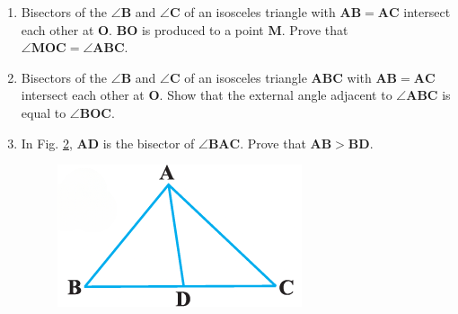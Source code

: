 \documentclass{article}
\let\vec\mathbf
\begin{document}
\begin{enumerate}[label=\thesection.\arabic*,ref=\thesection.\theenumi]
\begin{figure}[h]
	\caption{}
	\label{fig:exemplar/9.7.37.3.8}
\end{figure}
\item Bisectors of the $\angle \vec{B}$ and $\angle \vec{C}$ of an isosceles triangle with $\vec{AB=AC}$ intersect each other at $\vec{O}$. $\vec{BO}$ is produced to a point $\vec{M}$. Prove that $\angle \vec{MOC}= \angle \vec{ABC}$.
\item Bisectors of the $\angle \vec{B}$ and $\angle \vec{C}$ of an isosceles triangle $\vec{ABC}$ with $\vec{AB=AC}$ intersect each other at $\vec{O}$. Show that the external angle adjacent to $\angle \vec{ABC}$ is equal to $\angle \vec{BOC}$.
\item In Fig. \ref{fig:exemplar/9.7.37.3.11}, $\vec{AD}$ is the bisector of $\angle \vec{BAC}$. Prove that $\vec{AB>BD}$.
\begin{figure}[h]
	\centering
	\includegraphics[width=\columnwidth]{exemplar/9.7.3/figs/Figure5.png}
	\caption{}
	\label{fig:exemplar/9.7.37.3.11}
\end{figure}
\end{enumerate}
\end{document}
